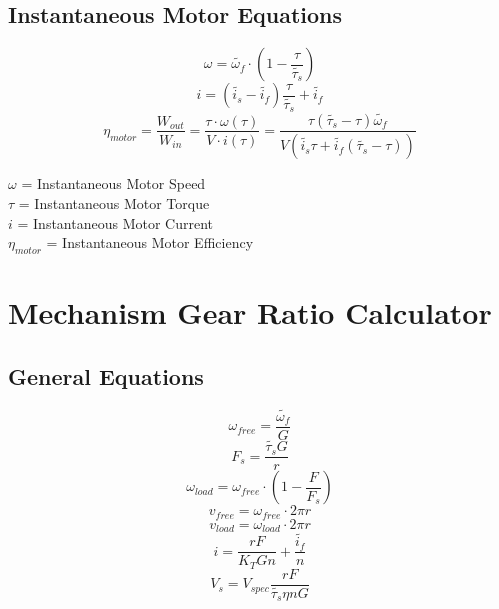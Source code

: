 \documentclass[11pt,a4paper,titlepage]{article}
\begin{document}
	\subsection{Instantaneous Motor Equations}
	\begin{equation} \label{motor_instant_speed}
	\omega = \tilde{\omega_f} \cdot (1 - \frac{\tau}{\tilde{\tau_s}})
	\end{equation}
	\begin{equation} \label{motor_instant_current}
	i = (\tilde{i_s} - \tilde{i_f}) \frac{\tau}{\tilde{\tau_s}} + \tilde{i_f}
	\end{equation}
	\begin{equation} \label{motor_instant_eff}
	\eta_{motor} = \frac{W_{out}}{W_{in}} = \frac{\tau \cdot \omega (\tau)}{V \cdot i (\tau)} = \frac{\tau (\tilde{\tau_s} - \tau) \tilde{\omega_f}}{V (\tilde{i_s} \tau + \tilde{i_f} (\tilde{\tau_s} - \tau))}
	\end{equation}
	
	$\omega$ = Instantaneous Motor Speed \\
	$\tau$ = Instantaneous Motor Torque \\
	$i$ = Instantaneous Motor Current \\
	$\eta_{motor}$ = Instantaneous Motor Efficiency
	
	\section{Mechanism Gear Ratio Calculator}
	\subsection{General Equations}
	\begin{equation}
		\omega_{free} = \frac{\tilde{\omega_f}}{G}
	\end{equation}
	\begin{equation} \label{stall_force}
		F_s = \frac{\tilde{\tau_s} G}{r}
	\end{equation}
	\begin{equation}
		\omega_{load} = \omega_{free} \cdot (1-\frac{F}{F_s})
	\end{equation}
	\begin{equation}
		v_{free} = \omega_{free} \cdot 2\pi r
	\end{equation}
	\begin{equation} \label{wheel_lin_rot}
		v_{load} = \omega_{load} \cdot 2\pi r
	\end{equation}
	\begin{equation} \label{current_per_motor}
		i = \frac{r F}{K_T G n} + \frac{\tilde{i_f}}{n}
	\end{equation}
	\begin{equation} \label{stall_volt}
		V_s = V_{spec} \frac{r F}{\tilde{\tau_s} \eta n G}
	\end{equation}
	
\end{document}
